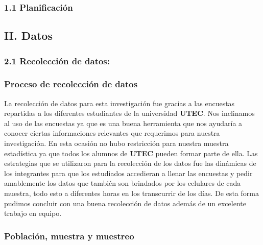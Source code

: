 \documentclass[
]{article}
\begin{document}
\hypertarget{planificaciuxf3n}{%
\subsubsection{1.1 Planificación}\label{planificaciuxf3n}}

\hypertarget{ii.-datos}{%
\subsection{II. Datos}\label{ii.-datos}}

\hypertarget{recolecciuxf3n-de-datos}{%
\subsubsection{2.1 Recolección de
datos:}\label{recolecciuxf3n-de-datos}}

\hypertarget{proceso-de-recolecciuxf3n-de-datos}{%
\subsubsection{\texorpdfstring{\textbf{Proceso de recolección de
datos}}{Proceso de recolección de datos}}\label{proceso-de-recolecciuxf3n-de-datos}}

La recolección de datos para esta investigación fue gracias a las
encuestas repartidas a los diferentes estudiantes de la universidad
\textbf{UTEC}. Nos inclinamos al uso de las encuestas ya que es una
buena herramienta que nos ayudaría a conocer ciertas informaciones
relevantes que requerimos para nuestra investigación. En esta ocasión no
hubo restricción para nuestra muestra estadística ya que todos los
alumnos de \textbf{UTEC} pueden formar parte de ella. Las estrategias
que se utilizaron para la recolección de los datos fue las dinámicas de
los integrantes para que los estudiados accedieran a llenar las
encuestas y pedir amablemente los datos que también son brindados por
los celulares de cada muestra, todo esto a diferentes horas en los
transcurrir de los días. De esta forma pudimos concluir con una buena
recolección de datos además de un excelente trabajo en equipo.

\hypertarget{poblaciuxf3n-muestra-y-muestreo}{%
\subsubsection{\texorpdfstring{\textbf{Población, muestra y
muestreo}}{Población, muestra y muestreo}}\label{poblaciuxf3n-muestra-y-muestreo}}
\end{document}
